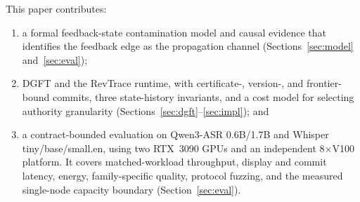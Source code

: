 This paper contributes:
\begin{enumerate}
  \item a formal feedback-state contamination model and causal evidence that
    identifies the feedback edge as the propagation channel
    (Sections~\ref{sec:model} and~\ref{sec:eval});
  \item DGFT and the RevTrace runtime, with certificate-, version-, and
    frontier-bound commits, three state-history invariants, and a cost model
    for selecting authority granularity
    (Sections~\ref{sec:dgft}--\ref{sec:impl}); and
  \item a contract-bounded evaluation on Qwen3-ASR 0.6B/1.7B and Whisper
    tiny/base/small.en, using two RTX~3090 GPUs and an independent
    8$\times$V100 platform. It covers matched-workload throughput, display and
    commit latency, energy, family-specific quality, protocol fuzzing, and the
    measured single-node capacity boundary (Section~\ref{sec:eval}).
\end{enumerate}
